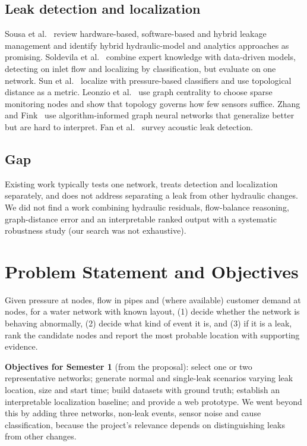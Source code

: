 \documentclass[11pt,a4paper]{article}
\begin{document}
\subsection{Leak detection and localization}
Sousa et al.~\cite{sousa2026review} review hardware-based, software-based and hybrid leakage management and identify hybrid hydraulic-model and analytics approaches as promising. Soldevila et al.~\cite{soldevila2021hybrid} combine expert knowledge with data-driven models, detecting on inlet flow and localizing by classification, but evaluate on one network. Sun et al.~\cite{sun2020leak} localize with pressure-based classifiers and use topological distance as a metric. Leonzio et al.~\cite{leonzio2026centrality} use graph centrality to choose sparse monitoring nodes and show that topology governs how few sensors suffice. Zhang and Fink~\cite{zhang2026aignn} use algorithm-informed graph neural networks that generalize better but are hard to interpret. Fan et al.~\cite{fan2022acoustic} survey acoustic leak detection.

\subsection{Gap}
Existing work typically tests one network, treats detection and localization separately, and does not address separating a leak from other hydraulic changes. We did not find a work combining hydraulic residuals, flow-balance reasoning, graph-distance error and an interpretable ranked output with a systematic robustness study (our search was not exhaustive).

\section{Problem Statement and Objectives}
Given pressure at nodes, flow in pipes and (where available) customer demand at nodes, for a water network with known layout, (1) decide whether the network is behaving abnormally, (2) decide what kind of event it is, and (3) if it is a leak, rank the candidate nodes and report the most probable location with supporting evidence.

\textbf{Objectives for Semester 1} (from the proposal): select one or two representative networks; generate normal and single-leak scenarios varying leak location, size and start time; build datasets with ground truth; establish an interpretable localization baseline; and provide a web prototype. We went beyond this by adding three networks, non-leak events, sensor noise and cause classification, because the project's relevance depends on distinguishing leaks from other changes.
\end{document}

